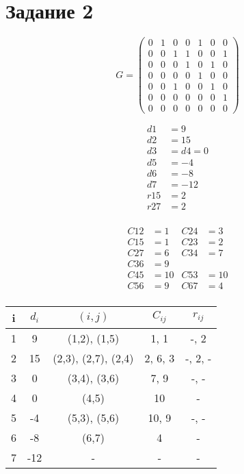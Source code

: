 \documentclass[a4paper,12pt]{article}
\begin{document}
\section*{Задание 2}

\[
G = \begin{pmatrix}
0 & 1 & 0 & 0 & 1 & 0 & 0 \\
0 & 0 & 1 & 1 & 0 & 0 & 1 \\
0 & 0 & 0 & 1 & 0 & 1 & 0 \\
0 & 0 & 0 & 0 & 1 & 0 & 0 \\
0 & 0 & 1 & 0 & 0 & 1 & 0 \\
0 & 0 & 0 & 0 & 0 & 0 & 1 \\
0 & 0 & 0 & 0 & 0 & 0 & 0
\end{pmatrix}
\]

\[
\begin{aligned}
d1 &= 9 \\
d2 &= 15 \\
d3 &= d4 = 0 \\
d5 &= -4 \\
d6 &= -8 \\
d7 &= -12 \\
r15 &= 2 \\
r27 &= 2 \\
\end{aligned}
\]

\[
\begin{aligned}
C12 &= 1 & C24 &= 3 \\
C15 &= 1 & C23 &= 2 \\
C27 &= 6 & C34 &= 7 \\
C36 &= 9 \\
C45 &= 10 & C53 &= 10 \\
C56 &= 9 & C67 &= 4 \\
\end{aligned}
\]

\begin{table}[h]
\centering
\begin{tabular}{|c|c|c|c|c|}
\hline
i & $d_i$ & $(i,j)$ & $C_{ij}$ & $r_{ij}$ \\
\hline
1 & 9 & (1,2), (1,5) & 1, 1 & -, 2 \\
2 & 15 & (2,3), (2,7), (2,4) & 2, 6, 3 & -, 2, - \\
3 & 0 & (3,4), (3,6) & 7, 9 & -, - \\
4 & 0 & (4,5) & 10 & - \\
5 & -4 & (5,3), (5,6) & 10, 9 & -, - \\
6 & -8 & (6,7) & 4 & - \\
7 & -12 & - & - & - \\
\hline
\end{tabular}
\end{table}
\end{document}
